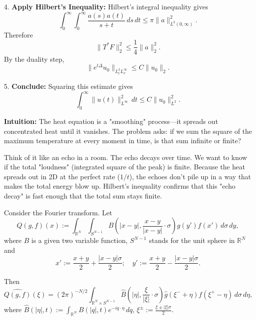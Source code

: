 \begin{solution}
\par\vspace{\baselineskip}
4. \textbf{Apply Hilbert's Inequality:} Hilbert's integral inequality gives
\[
\int_0^\infty\int_0^\infty
\frac{a(s)a(t)}{s+t}\,ds\,dt
\leq \pi \|a\|_{L^2(0,\infty)}^2.
\]
Therefore
\[
\|T^*F\|_2^2\leq \frac14\|a\|_2^2.
\]
By the duality step,
\[
\|e^{t\Delta}u_0\|_{L_t^2L_x^\infty}
\leq C\|u_0\|_2.
\]

\par\vspace{\baselineskip}
5. \textbf{Conclude:} Squaring this estimate gives
\[
\int_0^\infty \|u(t)\|_{L^\infty}^2\,dt
\leq C\|u_0\|_{L^2}^2.
\]

\par\vspace{\baselineskip}
\textbf{Intuition:}
The heat equation is a "smoothing" process—it spreads out concentrated heat until it vanishes. The problem asks: if we sum the square of the maximum temperature at every moment in time, is that sum infinite or finite?

\par\vspace{\baselineskip}
Think of it like an echo in a room. The echo decays over time. We want to know if the total "loudness" (integrated square of the peak) is finite. Because the heat spreads out in 2D at the perfect rate ($1/t$), the echoes don't pile up in a way that makes the total energy blow up. Hilbert's inequality confirms that this "echo decay" is fast enough that the total sum stays finite.
\end{solution}

\begin{exercise}
\label{analysis:2024:5}
Consider the Fourier transform. Let
\[
Q(g,f)(x) := \int_{\mathbb{R}^N}\int_{S^{N-1}} B(|x-y|,\frac{x-y}{|x-y|}\cdot\sigma)g(y')f(x')\,d\sigma\,dy,
\]
where $B$ is a given two variable function, $S^{N-1}$ stands for the unit sphere in $\mathbb{R}^N$ and
\[
x' := \frac{x+y}{2} + \frac{|x-y|\sigma}{2};\quad y' := \frac{x+y}{2} - \frac{|x-y|\sigma}{2}.
\]

Then
\[
\widehat{Q(g,f)}(\xi) = (2\pi)^{-N/2}\int_{\mathbb{R}^N\times S^{N-1}} \hat{B}(|\eta|,\frac{\xi}{|\xi|}\cdot\sigma)\hat{g}(\xi^-+\eta)\hat{f}(\xi^+-\eta)\,d\sigma\,d\eta,
\]
where $\hat{B}(|\eta|,t) := \int_{\mathbb{R}^N}B(|q|,t)e^{-iq\cdot\eta}\,dq$, $\xi^{\pm} := \frac{\xi\pm|\xi|\sigma}{2}$.
\end{exercise}

